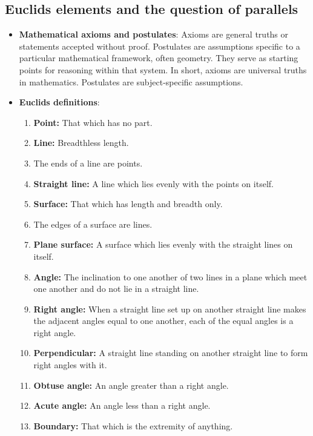\documentclass{report}
\begin{document}
    \subsection{Euclids elements and the question of parallels}
    \begin{itemize}
        \item \textbf{Mathematical axioms and postulates}: Axioms are general truths or statements accepted without proof. Postulates are assumptions specific to a particular mathematical framework, often geometry. They serve as starting points for reasoning within that system.
            \bigbreak \noindent 
            In short, axioms are universal truths in mathematics. Postulates are subject-specific assumptions.
        \item \textbf{Euclids definitions}:
            \begin{enumerate}
                \item \textbf{Point:} That which has no part.
                \item \textbf{Line:} Breadthless length.
                \item The ends of a line are points.
                \item \textbf{Straight line:} A line which lies evenly with the points on itself.
                \item \textbf{Surface:} That which has length and breadth only.
                \item The edges of a surface are lines.
                \item \textbf{Plane surface:} A surface which lies evenly with the straight lines on itself.
                \item \textbf{Angle:} The inclination to one another of two lines in a plane which meet one another and do not lie in a straight line.
                \item \textbf{Right angle:} When a straight line set up on another straight line makes the adjacent angles equal to one another, each of the equal angles is a right angle.
                \item \textbf{Perpendicular:} A straight line standing on another straight line to form right angles with it.
                \item \textbf{Obtuse angle:} An angle greater than a right angle.
                \item \textbf{Acute angle:} An angle less than a right angle.
                \item \textbf{Boundary:} That which is the extremity of anything.

\end{enumerate}
\end{itemize}
\end{document}
